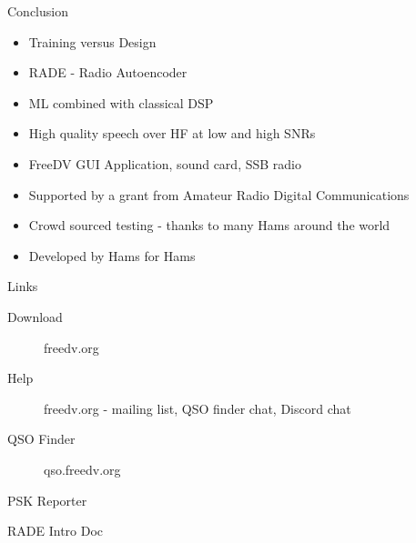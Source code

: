 \documentclass{beamer}
\begin{document}
\begin{frame}{Conclusion}
\begin{itemize}
	\item Training versus Design
	\item RADE - Radio Autoencoder
	\item ML combined with classical DSP
	\item High quality speech over HF at low and high SNRs
	\item FreeDV GUI Application, sound card, SSB radio
	\item Supported by a grant from Amateur Radio Digital Communications
	\item Crowd sourced testing - thanks to many Hams around the world
	\item Developed by Hams for Hams
\end{itemize}

\end{frame}

\begin{frame}{Links}
\begin{description}
    \item[Download] freedv.org 
    \item[Help] freedv.org - mailing list, QSO finder chat, Discord chat
    \item[QSO Finder] qso.freedv.org \href{http://qso.freedv.org}{}
    \item[PSK Reporter] \href{https://pskreporter.info/pskmap?preset&callsign=ZZZZZ&what=all&mode=FREEDV&timerange=86400&mapCenter=17.5,-8,2.6}{}    
    \item[RADE Intro Doc] \href{https://github.com/drowe67/radae/blob/main/doc/rade_intro_waveform.pdf} {}
\end{description}
\end{frame} 
\end{document}

